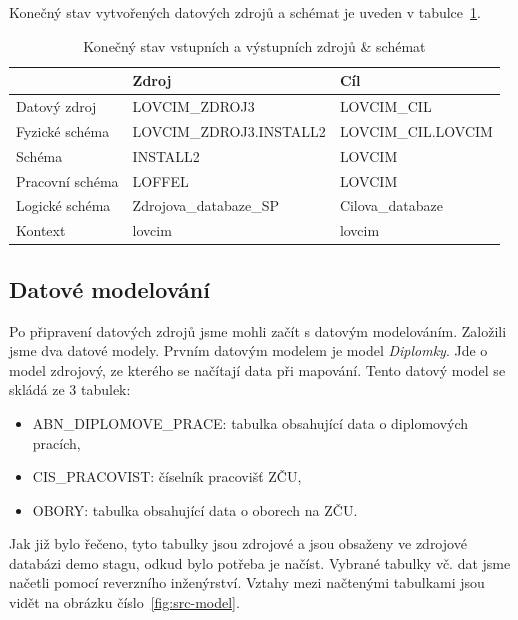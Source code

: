 Konečný stav vytvořených datových zdrojů a schémat je uveden v tabulce~\ref{table:table3}.

\begin{table}[htb]
    \centering

    \begin{tabular}{lll}
        \toprule

                        & Zdroj                     & Cíl                   \\ \midrule
        Datový zdroj    & LOVCIM\_ZDROJ3            & LOVCIM\_CIL           \\
        Fyzické schéma  & LOVCIM\_ZDROJ3.INSTALL2   & LOVCIM\_CIL.LOVCIM    \\
        Schéma          & INSTALL2                  & LOVCIM                \\
        Pracovní schéma & LOFFEL                    & LOVCIM                \\
        Logické schéma  & Zdrojova\_databaze\_SP    & Cilova\_databaze      \\
        Kontext         & lovcim                    & lovcim                \\
          
        \bottomrule
    \end{tabular}

    \caption{Konečný stav vstupních a výstupních zdrojů \& schémat}
    \label{table:table3}
\end{table}
\FloatBarrier

\subsection{Datové modelování}

Po připravení datových zdrojů jsme mohli začít s datovým modelováním.
Založili jsme dva datové modely.
Prvním datovým modelem je model \textit{Diplomky}.
Jde o model zdrojový, ze kterého se načítají data při mapování.
Tento datový model se skládá ze 3 tabulek: 

\begin{itemize}
    \item ABN\_DIPLOMOVE\_PRACE: tabulka obsahující data o diplomových pracích,
    \item CIS\_PRACOVIST: číselník pracovišť ZČU,
    \item OBORY: tabulka obsahující data o oborech na ZČU.
\end{itemize}

Jak již bylo řečeno, tyto tabulky jsou zdrojové a jsou obsaženy ve zdrojové databázi demo stagu, odkud bylo potřeba je načíst.
Vybrané tabulky vč. dat jsme načetli pomocí reverzního inženýrství.
Vztahy mezi načtenými tabulkami jsou vidět na obrázku číslo~\ref{fig:src-model}.

